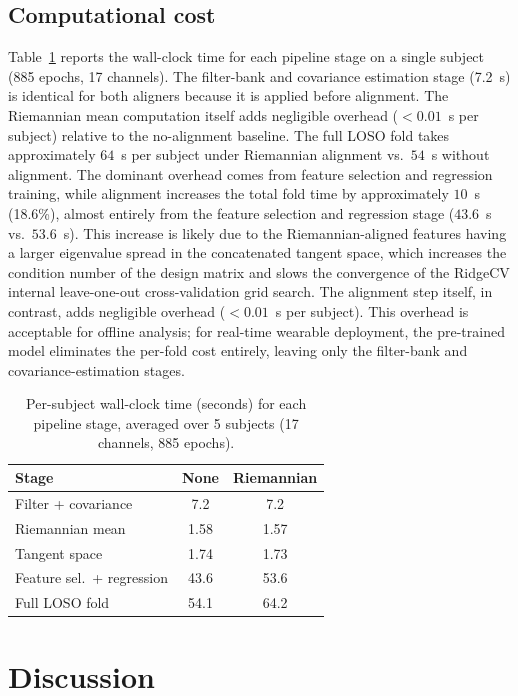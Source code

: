 \documentclass[journal,twoside,web]{ieeecolor2}
\begin{document}
\subsection{Computational cost}

Table~\ref{tab:compcost} reports the wall-clock time for each
pipeline stage on a single subject (885 epochs, 17 channels). The
filter-bank and covariance estimation stage (7.2~s) is identical for
both aligners because it is applied before alignment. The
Riemannian mean computation itself adds negligible overhead
($<0.01$~s per subject) relative to the no-alignment baseline. The
full LOSO fold takes approximately $64$~s per subject under Riemannian
alignment vs.\ $54$~s without alignment. The dominant overhead comes from
feature selection and regression training, while alignment increases
the total fold time by approximately $10$~s (18.6\%), almost entirely
from the feature selection and regression stage ($43.6$~s vs.\
$53.6$~s). This increase is likely due to the Riemannian-aligned
features having a larger eigenvalue spread in the concatenated
tangent space, which increases the condition number of the design
matrix and slows the convergence of the RidgeCV internal
leave-one-out cross-validation grid search. The alignment step
itself, in contrast, adds negligible overhead ($<0.01$~s per subject).
This overhead is acceptable for offline analysis;
for real-time wearable deployment, the pre-trained model eliminates
the per-fold cost entirely, leaving only the filter-bank and
covariance-estimation stages.

\begin{table}[!t]
\caption{Per-subject wall-clock time (seconds) for each pipeline
stage, averaged over 5 subjects (17 channels, 885 epochs).}
\label{tab:compcost}
\centering
\begin{tabular}{l c c}
\toprule
\textbf{Stage} & \textbf{None} & \textbf{Riemannian} \\
\midrule
Filter + covariance       & 7.2 & 7.2 \\
Riemannian mean           & 1.58 & 1.57 \\
Tangent space             & 1.74 & 1.73 \\
Feature sel.\ + regression & 43.6 & 53.6 \\
\midrule
Full LOSO fold            & 54.1 & 64.2 \\
\bottomrule
\end{tabular}
\end{table}

\section{Discussion}
\label{sec:discussion}
\end{document}
